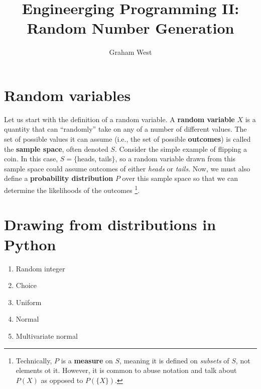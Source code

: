 \documentclass{article}
\begin{document}
\title{Engineerging Programming II: \\ Random Number Generation}
\author{Graham West}
\date{}

\maketitle

\large

\tableofcontents

\section{Random variables}

Let us start with the definition of a random variable. A \textbf{random variable} $X$ is a quantity that can ``randomly'' take on any of a number of different values. The set of possible values it can assume (i.e., the set of possible \textbf{outcomes}) is called the \textbf{sample space}, often denoted $S$. Consider the simple example of flipping a coin. In this case, $S=\{$heads, tails$\}$, so a random variable drawn from this sample space could assume outcomes of either \emph{heads} or \emph{tails}. Now, we must also define a \textbf{probability distribution} $P$ over this sample space so that we can determine the likelihoods of the outcomes \footnote{Technically, $P$ is a \textbf{measure} on $S$, meaning it is defined on \emph{subsets} of $S$, not elements ot it. However, it is common to abuse notation and talk about $P(X)$ as opposed to $P(\{X\})$.}. 




\section{Drawing from distributions in Python}

\begin{enumerate}
	\item Random integer
	\item Choice
	\item Uniform
	\item Normal
	\item Multivariate normal
\end{enumerate}
\end{document}
